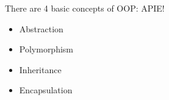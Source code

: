 \documentclass[11pt,twoside,a4paper]{article}
\begin{document}
\begin{landscape}
\begin{multicols}{2}
There are 4 basic concepts of OOP: APIE!
\begin{itemize}
	\item Abstraction
	\item Polymorphism
	\item Inheritance
	\item Encapsulation
\end{itemize}~\\

	
	\vfill ~\\
	
	\columnbreak
	

\end{multicols}
\end{landscape}
\end{document}
